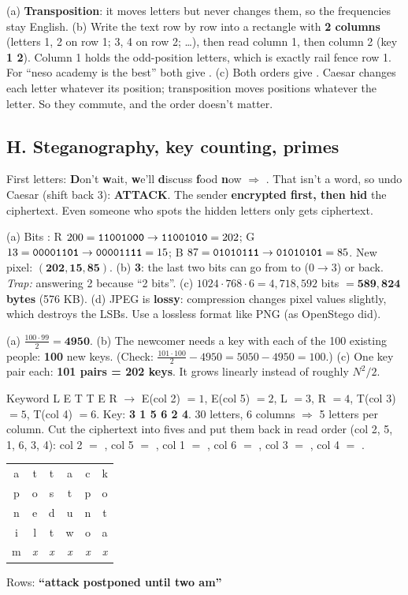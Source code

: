 \ans (a) \textbf{Transposition}: it moves letters but never changes them, so the frequencies stay English.
(b) Write the text row by row into a rectangle with \textbf{2 columns} (letters 1, 2 on row 1; 3, 4 on row 2; \dots), then read column 1, then column 2 (key \textbf{1 2}). Column 1 holds the odd-position letters, which is exactly rail fence row 1. For ``neso academy is the best'' both give .
(c) Both orders give \textbf{}. Caesar changes each letter whatever its position; transposition moves positions whatever the letter. So they commute, and the order doesn't matter.

\subsection*{H. Steganography, key counting, primes}

\ans First letters: \textbf{D}on't \textbf{w}ait, \textbf{w}e'll \textbf{d}iscuss \textbf{f}ood \textbf{n}ow $\Rightarrow$ . That isn't a word, so undo Caesar (shift back 3): \textbf{ATTACK}.
The sender \textbf{encrypted first, then hid} the ciphertext. Even someone who spots the hidden letters only gets ciphertext.

\ans (a) Bits :
R $200 = \texttt{110010\textbf{00}} \to \texttt{110010\textbf{10}} = 202$;
G $13 = \texttt{000011\textbf{01}} \to \texttt{000011\textbf{11}} = 15$;
B $87 = \texttt{010101\textbf{11}} \to \texttt{010101\textbf{01}} = 85$.
New pixel: $\mathbf{(202, 15, 85)}$.
(b) \textbf{3}: the last two bits can go from  to  ($0 \to 3$) or back. \emph{Trap:} answering 2 because ``2 bits''.
(c) $1024 \cdot 768 \cdot 6 = 4{,}718{,}592$ bits $= \mathbf{589{,}824}$ \textbf{bytes} (576 KB).
(d) JPEG is \textbf{lossy}: compression changes pixel values slightly, which destroys the LSBs. Use a lossless format like PNG (as OpenStego did).

\ans (a) $\frac{100 \cdot 99}{2} = \mathbf{4950}$.
(b) The newcomer needs a key with each of the 100 existing people: \textbf{100} new keys. (Check: $\frac{101 \cdot 100}{2} - 4950 = 5050 - 4950 = 100$.)
(c) One key pair each: \textbf{101 pairs = 202 keys}. It grows linearly instead of roughly $N^2/2$.

\ans Keyword L E T T E R $\to$ E(col 2) $=1$, E(col 5) $=2$, L $=3$, R $=4$, T(col 3) $=5$, T(col 4) $=6$. Key: \textbf{3 1 5 6 2 4}.
30 letters, 6 columns $\Rightarrow$ 5 letters per column. Cut the ciphertext into fives and put them back in read order (col 2, 5, 1, 6, 3, 4):
col 2 $=$ , col 5 $=$ , col 1 $=$ , col 6 $=$ , col 3 $=$ , col 4 $=$ .
\begin{center}\small
\begin{tabular}{|cccccc|}\hline a&t&t&a&c&k\\ p&o&s&t&p&o\\ n&e&d&u&n&t\\ i&l&t&w&o&a\\ m&\textit{x}&\textit{x}&\textit{x}&\textit{x}&\textit{x}\\\hline\end{tabular}
\quad Rows: \textbf{``attack postponed until two am''}
\end{center}

